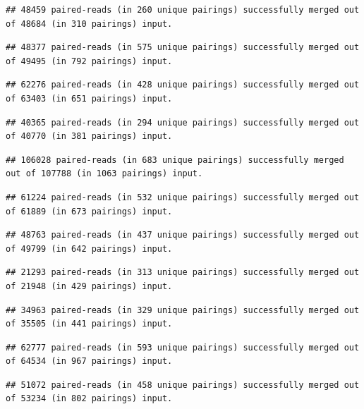 \documentclass[
]{article}
\begin{document}
\begin{verbatim}
## 48459 paired-reads (in 260 unique pairings) successfully merged out of 48684 (in 310 pairings) input.
\end{verbatim}

\begin{verbatim}
## 48377 paired-reads (in 575 unique pairings) successfully merged out of 49495 (in 792 pairings) input.
\end{verbatim}

\begin{verbatim}
## 62276 paired-reads (in 428 unique pairings) successfully merged out of 63403 (in 651 pairings) input.
\end{verbatim}

\begin{verbatim}
## 40365 paired-reads (in 294 unique pairings) successfully merged out of 40770 (in 381 pairings) input.
\end{verbatim}

\begin{verbatim}
## 106028 paired-reads (in 683 unique pairings) successfully merged out of 107788 (in 1063 pairings) input.
\end{verbatim}

\begin{verbatim}
## 61224 paired-reads (in 532 unique pairings) successfully merged out of 61889 (in 673 pairings) input.
\end{verbatim}

\begin{verbatim}
## 48763 paired-reads (in 437 unique pairings) successfully merged out of 49799 (in 642 pairings) input.
\end{verbatim}

\begin{verbatim}
## 21293 paired-reads (in 313 unique pairings) successfully merged out of 21948 (in 429 pairings) input.
\end{verbatim}

\begin{verbatim}
## 34963 paired-reads (in 329 unique pairings) successfully merged out of 35505 (in 441 pairings) input.
\end{verbatim}

\begin{verbatim}
## 62777 paired-reads (in 593 unique pairings) successfully merged out of 64534 (in 967 pairings) input.
\end{verbatim}

\begin{verbatim}
## 51072 paired-reads (in 458 unique pairings) successfully merged out of 53234 (in 802 pairings) input.
\end{verbatim}
\end{document}
